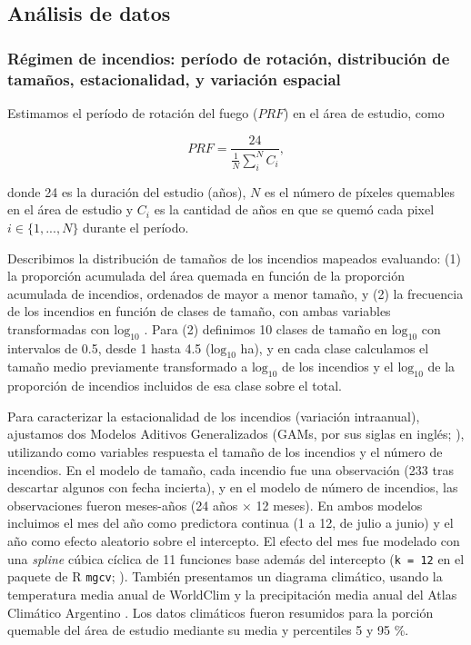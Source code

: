 \subsection{Análisis de datos}

\subsubsection{Régimen de incendios: período de rotación, distribución de tamaños, estacionalidad, y variación espacial}

Estimamos el período de rotación del fuego ($PRF$) en el área de estudio, como 

\begin{equation}
    PRF = \frac{24}{\frac{1}{N}\sum_i^N C_i},
\end{equation}

\noindent donde 24 es la duración del estudio (años), $N$ es el número de píxeles quemables en el área de estudio y $C_i$ es la cantidad de años en que se quemó cada pixel $i \in \{1, ..., N\}$ durante el período. 

Describimos la distribución de tamaños de los incendios mapeados evaluando: (1) la proporción acumulada del área quemada en función de la proporción acumulada de incendios, ordenados de mayor a menor tamaño, y (2) la frecuencia de los incendios en función de clases de tamaño, con ambas variables transformadas con $\text{log}_{10}$ \citep{pueyo_testing_2010}. Para (2) definimos 10 clases de tamaño en $\text{log}_{10}$ con intervalos de 0.5, desde 1 hasta 4.5 ($\text{log}_{10}$ ha), y en cada clase calculamos el tamaño medio previamente transformado a $\text{log}_{10}$ de los incendios y el $\text{log}_{10}$ de la proporción de incendios incluidos de esa clase sobre el total.

Para caracterizar la estacionalidad de los incendios (variación intraanual), ajustamos dos Modelos Aditivos Generalizados (GAMs, por sus siglas en inglés; \citealt{wood_generalized_2017}), utilizando como variables respuesta el tamaño de los incendios y el número de incendios. En el modelo de tamaño, cada incendio fue una observación (233 tras descartar algunos con fecha incierta), y en el modelo de número de incendios, las observaciones fueron meses-años (24 años $\times$ 12 meses). En ambos modelos incluimos el mes del año como predictora continua (1 a 12, de julio a junio) y el año como efecto aleatorio sobre el intercepto. El efecto del mes fue modelado con una \textit{spline} cúbica cíclica de 11 funciones base además del intercepto (\texttt{k = 12} en el paquete de R \texttt{mgcv}; \citealt{wood_generalized_2017}). También presentamos un diagrama climático, usando la temperatura media anual de WorldClim \citep{hijmans_very_2005} y la precipitación media anual del Atlas Climático Argentino \citep{bianchi_atlas_2010}. Los datos climáticos fueron resumidos para la porción quemable del área de estudio mediante su media y percentiles 5 y 95 \%.

